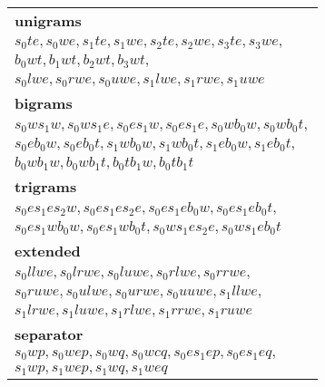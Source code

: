 \documentclass[11pt]{article}
\begin{document}
\begin{figure*}
\begin{adjustbox}{width=\textwidth}
\small
\begin{minipage}[c][11cm][t]{.5\textwidth}
\vspace*{\fill}
\begin{tabular}{l}
\textbf{unigrams} \\
$s_0te, s_0we, s_1te, s_1we, s_2te, s_2we, s_3te, s_3we,$ \\
$b_0wt, b_1wt, b_2wt, b_3wt,$ \\
$s_0lwe, s_0rwe, s_0uwe, s_1lwe, s_1rwe, s_1uwe$ \\
\textbf{bigrams} \\
$s_0ws_1w, s_0ws_1e, s_0es_1w, s_0es_1e, s_0wb_0w, s_0wb_0t,$ \\
$s_0eb_0w, s_0eb_0t, s_1wb_0w, s_1wb_0t, s_1eb_0w, s_1eb_0t,$ \\
$b_0wb_1w, b_0wb_1t, b_0tb_1w, b_0tb_1t$ \\
\textbf{trigrams} \\
$s_0es_1es_2w, s_0es_1es_2e, s_0es_1eb_0w, s_0es_1eb_0t,$ \\
$s_0es_1wb_0w, s_0es_1wb_0t, s_0ws_1es_2e, s_0ws_1eb_0t$ \\
\textbf{extended} \\
$s_0llwe, s_0lrwe, s_0luwe, s_0rlwe, s_0rrwe,$ \\
$s_0ruwe, s_0ulwe, s_0urwe, s_0uuwe, s_1llwe,$ \\
$s_1lrwe, s_1luwe, s_1rlwe, s_1rrwe, s_1ruwe$ \\
\textbf{separator} \\
$s_0wp, s_0wep, s_0wq, s_0wcq, s_0es_1ep, s_0es_1eq,$ \\
$s_1wp, s_1wep, s_1wq, s_1weq$
\end{tabular}
\end{minipage}


\end{adjustbox}
\end{figure*}
\end{document}
